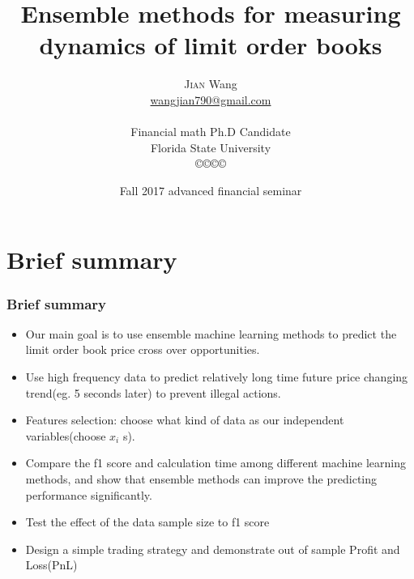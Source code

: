\documentclass[xcolor={x11names,svgnames,dvipsnames}]{beamer}
\author[\textsc{Jian} Wang]{\textsc{Jian} Wang\\[1ex]%
{\small\url{wangjian790@gmail.com}\\[-.5ex]\url{}}\\
{\small{Financial math Ph.D Candidate}}\\
{\small{Florida State University}}\\
[0.8ex]\copyright\copyright\copyright\copyright} %
\title{Ensemble methods for measuring dynamics of limit order books}
\date[\textsc{Financial seminar} 2017]{Fall 2017 advanced financial seminar\\ }%
\begin{document}
\begin{frame}
\maketitle
\end{frame}



\section{Brief summary}
\begin{frame}
\frametitle{Brief summary}
\begin{itemize}
	\item Our main goal is to use ensemble machine learning methods to predict the limit order book price \alert{cross over} opportunities.  	
	\item Use high frequency data to predict relatively \alert{long time} future price changing trend(eg. 5 seconds later) to prevent illegal actions.
     \item Features selection: choose what kind of data as our independent variables(\alert{choose $x_i$ s}).  
   	\item Compare the f1 score and calculation time  among different machine learning methods, and show that ensemble methods can improve the \alert{predicting performance} significantly. 
   	\item Test the effect of the data sample size to f1 score 	
   	\item Design a simple trading strategy and demonstrate \alert{out of sample} Profit and Loss(PnL)
\end{itemize}
\end{frame}
\end{document}
